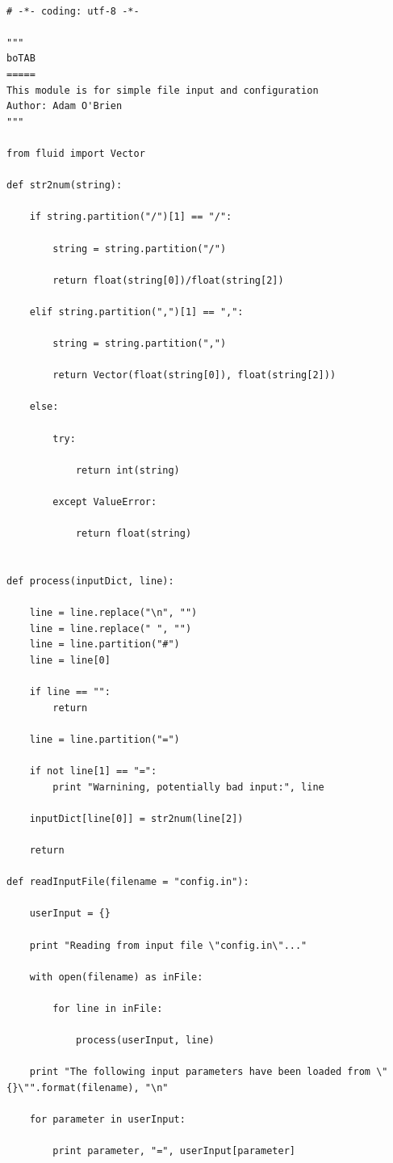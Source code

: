 \documentclass[12pt]{article}
\begin{document}
\begin{lstlisting}

# -*- coding: utf-8 -*-

"""
boTAB
=====
This module is for simple file input and configuration
Author: Adam O'Brien
"""

from fluid import Vector

def str2num(string):

    if string.partition("/")[1] == "/":

        string = string.partition("/")

        return float(string[0])/float(string[2])

    elif string.partition(",")[1] == ",":

        string = string.partition(",")

        return Vector(float(string[0]), float(string[2]))

    else:

        try:

            return int(string)

        except ValueError:

            return float(string)


def process(inputDict, line):

    line = line.replace("\n", "")
    line = line.replace(" ", "")
    line = line.partition("#")
    line = line[0]

    if line == "":
        return

    line = line.partition("=")

    if not line[1] == "=":
        print "Warnining, potentially bad input:", line

    inputDict[line[0]] = str2num(line[2])

    return

def readInputFile(filename = "config.in"):

    userInput = {}

    print "Reading from input file \"config.in\"..."

    with open(filename) as inFile:

        for line in inFile:

            process(userInput, line)

    print "The following input parameters have been loaded from \"{}\"".format(filename), "\n"

    for parameter in userInput:

        print parameter, "=", userInput[parameter]


\end{lstlisting}
\end{document}
